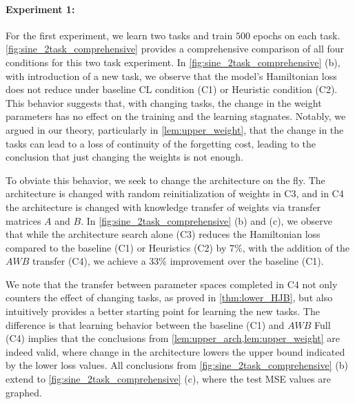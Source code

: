 \paragraph{Experiment 1:} For the first experiment, we learn two tasks and train $500$ epochs on each task. \cref{fig:sine_2task_comprehensive} provides a comprehensive comparison of all four conditions for this two task experiment. In \cref{fig:sine_2task_comprehensive} (b), with introduction of a new task, we observe that the model's Hamiltonian loss does not reduce under baseline CL condition (C1) or Heuristic condition (C2). This behavior suggests that, with changing tasks, the change in the weight parameters has no effect on the training and the learning stagnates. Notably, we argued in our theory, particularly in \cref{lem:upper_weight}, that the change in the tasks can lead to a loss of continuity of the forgetting cost, leading to the conclusion that just changing the weights is not enough. 
 
To obviate this behavior, we seek to change the architecture on the fly. The architecture is changed with random reinitialization of weights in C3, and in C4 the architecture is changed with knowledge transfer of weights via transfer matrices $A$ and $B.$ In \cref{fig:sine_2task_comprehensive} (b) and (c), we observe that while the architecture search alone (C3) reduces the Hamiltonian loss compared to the baseline (C1) or Heuristics (C2) by 7\%, 
with the addition of the $AWB$ transfer (C4), we achieve a 33\% improvement over the baseline (C1). 

We note that the transfer between parameter spaces completed in C4 not only counters the effect of changing tasks, as proved in \cref{thm:lower_HJB}, but also intuitively provides a better starting point for learning the new tasks. The difference is that learning behavior between the baseline (C1) and $AWB$ Full (C4) implies that the conclusions from \cref{lem:upper_arch,lem:upper_weight} are indeed valid, where change in the architecture lowers the upper bound indicated by the lower loss values. All conclusions from \cref{fig:sine_2task_comprehensive} (b) extend to \cref{fig:sine_2task_comprehensive} (c), where the test MSE values are graphed.



